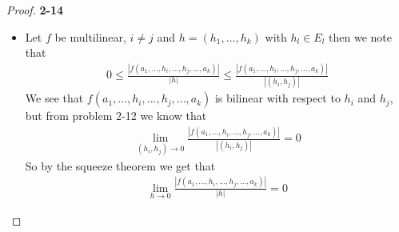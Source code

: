 \documentclass[11pt]{article}
\theoremstyle{definition}
\begin{document}
\cleardoublepage
\begin{proof}{\textbf{2-14}}\\
\begin{itemize}
\item [(a)] Let $f$ be multilinear, $i \neq j$ and $h = (h_1, ..., h_k)$ with
$h_l \in E_l$ then we note that
\begin{align*}
    0 \leq \frac{|f(a_1, ..., h_i, ..., h_j, ..., a_k)|}{|h|}
    \leq \frac{|f(a_1, ..., h_i, ..., h_j, ..., a_k)|}{|(h_i, h_j)|}
\end{align*}
We see that $f(a_1, ..., h_i, ..., h_j, ..., a_k)$ is bilinear with respect to
$h_i$ and $h_j$, but from problem 2-12 we know that
\begin{align*}
    \lim_{(h_i, h_j) \to 0}
    \frac{|f(a_1, ..., h_i, ..., h_j, ..., a_k)|}{|(h_i, h_j)|} = 0 
\end{align*}
So by the squeeze theorem we get that
\begin{align*}
    \lim_{h\to 0} \frac{|f(a_1, ..., h_i, ..., h_j, ..., a_k)|}{|h|} = 0
\end{align*}


\end{itemize}
\end{proof}
\end{document}
